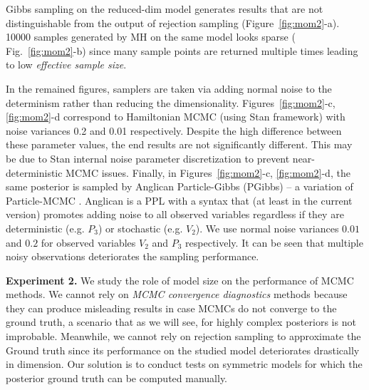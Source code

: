 \documentclass{article}
\begin{document}
 
Gibbs sampling on the {\color{green} reduced-dim} model generates results that are not distinguishable from the output of rejection sampling
(Figure~\ref{fig:mom2}-a).
10000 samples generated by MH on the same model looks sparse ( Fig.~\ref{fig:mom2}-b) since many sample points are returned multiple times leading to low \emph{effective sample size}.

In the remained figures, samplers are taken via adding normal noise to the determinism rather than reducing the dimensionality.
Figures~\ref{fig:mom2}-c, \ref{fig:mom2}-d
correspond to Hamiltonian MCMC (using Stan framework) 
with noise variances 0.2 and 0.01 respectively. 
Despite the high difference between these parameter values, the end results are not significantly different. 
This may be due to Stan
internal noise parameter discretization to prevent near-deterministic MCMC issues. 
Finally, in Figures~\ref{fig:mom2}-c, \ref{fig:mom2}-d, the same posterior is sampled by Anglican
Particle-Gibbs (PGibbs) -- a variation of Particle-MCMC \cite{andrieu2010particle}. 
Anglican \cite{wood2014new} is a PPL with a syntax that (at least in the current version) promotes adding noise to all observed variables regardless if they are deterministic 
(e.g. $P_3$) or stochastic (e.g. $V_2$). 
We use normal noise variances $0.01$ and $0.2$ for observed variables $V_2$  and $P_3$ respectively.
It can be seen that multiple noisy observations deteriorates the sampling performance.

\textbf{Experiment 2.} %
We study the role of model size on the performance of MCMC methods.
We cannot rely on \emph{MCMC convergence diagnostics} methods \cite{cowles1996markov} because they can produce misleading results in case MCMCs do not converge to the ground truth, a scenario that as we will see, for highly complex posteriors is not improbable.
Meanwhile, we cannot rely on rejection sampling to approximate the Ground truth since its performance on the studied model deteriorates drastically in dimension.
Our solution is to conduct tests on symmetric models for which the posterior ground truth can be computed manually.
\end{document}
